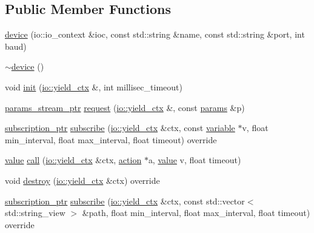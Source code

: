 \subsection*{Public Member Functions}
\begin{DoxyCompactItemize}
\item 
\hyperlink{classtelegraph_1_1device_a439a2eae3e8fceab20e87dea027dd912}{device} (io\+::io\+\_\+context \&ioc, const std\+::string \&name, const std\+::string \&port, int baud)
\item 
\hyperlink{classtelegraph_1_1device_a55d99b0a3df689b60480a54ebaab6a44}{$\sim$device} ()
\item 
void \hyperlink{classtelegraph_1_1device_a2f56da47b6e816ac9fd3b1ff2db5d2c9}{init} (\hyperlink{structboost_1_1asio_1_1yield__ctx}{io\+::yield\+\_\+ctx} \&, int millisec\+\_\+timeout)
\item 
\hyperlink{namespacetelegraph_ad071241508ea0f86c7de0686016f9ca9}{params\+\_\+stream\+\_\+ptr} \hyperlink{classtelegraph_1_1device_a9e5042e4640035b28dd9de780d7326df}{request} (\hyperlink{structboost_1_1asio_1_1yield__ctx}{io\+::yield\+\_\+ctx} \&, const \hyperlink{classtelegraph_1_1params}{params} \&p)
\item 
\hyperlink{namespacetelegraph_a58641aa5b1a2cbdb0431916a87069f64}{subscription\+\_\+ptr} \hyperlink{classtelegraph_1_1device_ab0117f6015f904afae72d6ab90c8ad95}{subscribe} (\hyperlink{structboost_1_1asio_1_1yield__ctx}{io\+::yield\+\_\+ctx} \&ctx, const \hyperlink{classtelegraph_1_1variable}{variable} $\ast$v, float min\+\_\+interval, float max\+\_\+interval, float timeout) override
\item 
\hyperlink{classtelegraph_1_1value}{value} \hyperlink{classtelegraph_1_1device_ac6558ddeed4799f4d69428863363a1e6}{call} (\hyperlink{structboost_1_1asio_1_1yield__ctx}{io\+::yield\+\_\+ctx} \&ctx, \hyperlink{classtelegraph_1_1action}{action} $\ast$a, \hyperlink{classtelegraph_1_1value}{value} v, float timeout)
\item 
void \hyperlink{classtelegraph_1_1device_a8d619b64e89b2ae933b282dc05956d37}{destroy} (\hyperlink{structboost_1_1asio_1_1yield__ctx}{io\+::yield\+\_\+ctx} \&ctx) override
\item 
\hyperlink{namespacetelegraph_a58641aa5b1a2cbdb0431916a87069f64}{subscription\+\_\+ptr} \hyperlink{classtelegraph_1_1device_aedf52d2dbb133e2b71958c116671b9df}{subscribe} (\hyperlink{structboost_1_1asio_1_1yield__ctx}{io\+::yield\+\_\+ctx} \&ctx, const std\+::vector$<$ std\+::string\+\_\+view $>$ \&path, float min\+\_\+interval, float max\+\_\+interval, float timeout) override

\end{DoxyCompactItemize}
